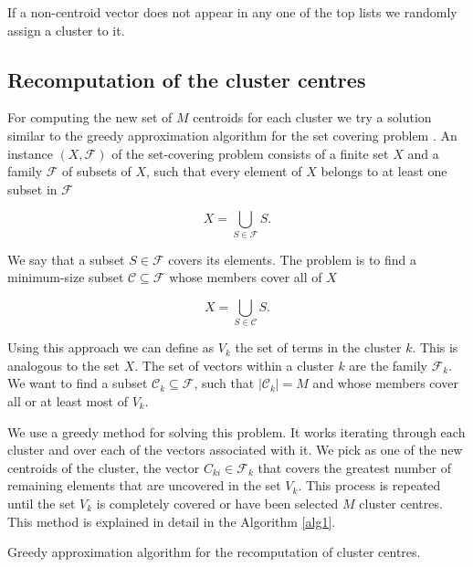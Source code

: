 \documentclass[runningheads]{llncs}
\begin{document}
If a non-centroid vector does not appear in any one of the
top lists we randomly assign a cluster to it.


\subsection{Recomputation of the cluster centres}

For computing the new set of $M$ centroids for each cluster
we try a solution similar to the greedy approximation
algorithm  for the set covering problem \cite{cormen_leiserson_rivest_stein_2009}.
An instance $(X, \mathcal{F})$ of the set-covering problem consists of
a finite set $X$ and a family $\mathcal{F}$ of subsets of $X$, such that 
every element of $X$ belongs to at least one subset in $\mathcal{F}$

\[
X = \bigcup_{S\in \mathcal{F}} S.
\]

We say that a subset $S\in \mathcal{F}$ covers its elements. The problem is to find a minimum-size subset $\mathcal{C} \subseteq \mathcal{F}$ whose members cover all of $X$

\[
X = \bigcup_{S \in \mathcal{C}} S.
\]

Using this approach we can define as $V_k$ the set of terms in the cluster $k$. This is analogous to the set $X$. The set of vectors within a cluster $k$ are the family $\mathcal{F}_k$. We want to find a subset $\mathcal{C}_k \subseteq \mathcal{F}$, such that $|\mathcal{C}_k| = M$ and whose members cover all or at least most of $V_k$.

We use a greedy method for solving this problem. It works iterating
through each cluster and over each of the vectors associated with it. We pick as one of the new centroids of the cluster, the vector $C_{ki} \in \mathcal{F}_k$ that covers the greatest number of remaining elements that are uncovered in the set $V_k$. This process is repeated until the set
$V_k$ is completely covered or have been selected $M$ cluster centres.
This method is explained in detail in the Algorithm \ref{alg1}.

\begin{algorithm}
\begin{algorithmic}
\ENDWHILE
\ENDFOR

\caption{Greedy approximation algorithm for the recomputation of cluster centres.\label{alg1}}
\end{algorithmic}
\end{algorithm}
\end{document}
